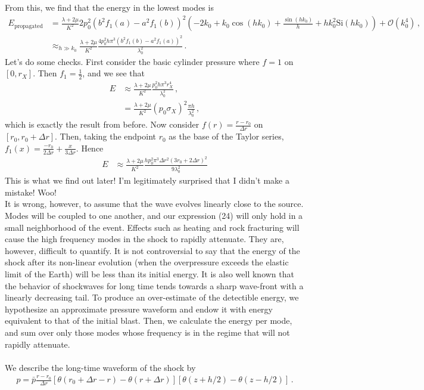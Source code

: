 \documentclass{article}
\newcommand*\scr[1]{\mathscr{#1}}
\newcommand*\te[1]{\text{#1}}
\newcommand*\p[1]{\left(#1\right)}
\newcommand*\ps[1]{\left[#1\right]}
\newcommand*\f[2]{\frac{#1}{#2}}
\begin{document}
From this, we find that the energy in the lowest modes is
\begin{align}
E_{\te{propagated}}&=\f{\lambda+2\mu}{K^2}2p_0^2(b^2f_1(a)-a^2f_1(b))^2\p{-2k_0+k_0\cos(h k_0)+\f{\sin(h k_0)}{h}+h k_0^2\te{Si}(h k_0)}+\scr O(k_0^4)\,,\\
&\approx_{h\gg k_0}\f{\lambda+2\mu}{K^2} \f{4 p_0^2h\pi^3(b^2 f_1(b)-a^2f_1(a))^2}{\lambda_0^2}\,.
\end{align}
Let's do some checks. First consider the basic cylinder pressure where $f=1$ on $[0,r_X]$. Then $f_1=\f12$, and we see that
\begin{align}
E&\approx\f{\lambda+2\mu}{K^2}\f{p_0^2h\pi^3r_X^4}{\lambda_0^2}\,,\\
&=\f{\lambda+2\mu}{K^2}(p_0\sigma_X)^2\f{\pi h}{\lambda_0^2}\,,
\end{align}
which is exactly the result from before. Now consider $f(r)=\f{r-r_0}{\Delta r}$ on $[r_0,r_0+\Delta r]$. Then, taking the endpoint $r_0$ as the base of the Taylor series, $f_1(x)=\f{-r_0}{2\Delta r}+\f{x}{3\Delta r}$. Hence
\begin{align}
E&\approx\f{\lambda+2\mu}{K^2}\f{h p_0^2\pi^3\Delta r^2(3r_0+2\Delta r)^2}{9\lambda_0^2}
\end{align}
This is what we find out later! I'm legitimately surprised that I didn't make a mistake! Woo!
\pagebreak
\\
It is wrong, however, to assume that the wave evolves linearly close to the source. Modes will be coupled to one another, and our expression (24) will only hold in a small neighborhood of the event. Effects such as heating and rock fracturing will cause the high frequency modes in the shock to rapidly attenuate. They are, however, difficult to quantify. It is not controversial to say that the energy of the shock after its non-linear evolution (when the overpressure exceeds the elastic limit of the Earth) will be less than its initial energy. It is also well known that the behavior of shockwaves for long time tends towards a sharp wave-front with a linearly decreasing tail. To produce an over-estimate of the detectible energy, we hypothesize an approximate pressure waveform and endow it with energy equivalent to that of the initial blast. Then, we calculate the energy per mode, and sum over only those modes whose frequency is in the regime that will not rapidly attenuate.
\\\\
We describe the long-time waveform of the shock by
\begin{align}
p=\bar p\f{r-r_0}{\Delta r}\ps{\theta(r_0+\Delta r-r)-\theta(r+\Delta r)}\ps{\theta(z+h/2)-\theta(z-h/2)}\,.
\end{align}
\end{document}
